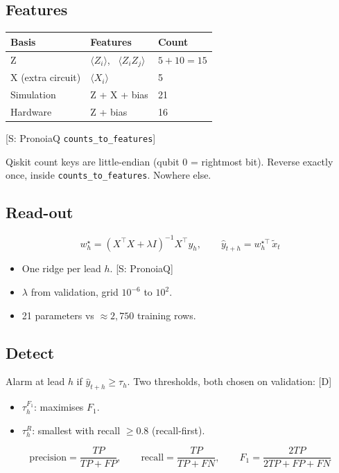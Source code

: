 \documentclass[11pt,a4paper]{article}
\newcommand{\tagbox}[2]{{\footnotesize\color{#1}\textsf{[#2]}}}
\newcommand{\supp}[1]{\tagbox{ForestGreen!70!black}{S: #1}}  %
\newcommand{\ours}{\tagbox{NavyBlue}{D}}                      %
\newcommand{\code}[1]{\texttt{\small #1}}
\begin{document}
\subsection{Features}
\begin{center}\small
\begin{tabular}{@{}lll@{}}
\toprule
\textbf{Basis} & \textbf{Features} & \textbf{Count}\\
\midrule
Z & $\langle Z_i\rangle$, \ $\langle Z_iZ_j\rangle$ & $5+10=15$\\
X (extra circuit) & $\langle X_i\rangle$ & 5\\
\midrule
Simulation & Z + X + bias & 21\\
Hardware & Z + bias & 16\\
\bottomrule
\end{tabular}
\end{center}
\supp{PronoiaQ \code{counts\_to\_features}}

\begin{watch}
Qiskit count keys are little-endian (qubit 0 = rightmost bit). Reverse exactly once, inside
\code{counts\_to\_features}. Nowhere else.
\end{watch}

\subsection{Read-out}
\[
w_h^\star=(X^\top X+\lambda I)^{-1}X^\top y_h,
\qquad
\hat y_{t+h}=w_h^{\star\top}\,\tilde x_t
\]
\begin{itemize}
\item One ridge per lead $h$. \supp{PronoiaQ}
\item $\lambda$ from validation, grid $10^{-6}$ to $10^{2}$.
\item 21 parameters vs $\approx2{,}750$ training rows.
\end{itemize}

\subsection{Detect}
Alarm at lead $h$ if $\hat y_{t+h}\ge\tau_h$. Two thresholds, both chosen on validation: \ours
\begin{itemize}
\item $\tau_h^{F_1}$: maximises $F_1$.
\item $\tau_h^{R}$: smallest with recall $\ge0.8$ (recall-first).
\end{itemize}
\[
\text{precision}=\frac{TP}{TP+FP},\qquad
\text{recall}=\frac{TP}{TP+FN},\qquad
F_1=\frac{2TP}{2TP+FP+FN}
\]
\end{document}
